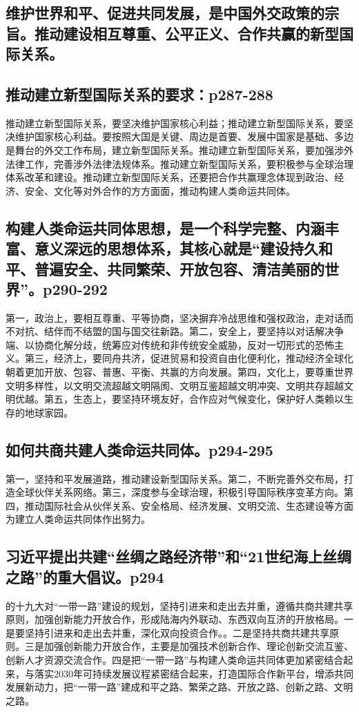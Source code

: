 \documentclass[UTF8]{ctexart}
\begin{document}
\subsection{维护世界和平、促进共同发展，是中国外交政策的宗旨。推动建设相互尊重、公平正义、合作共赢的新型国际关系。}
\subsection{推动建立新型国际关系的要求：p287-288}
推动建立新型国际关系，要坚决维护国家核心利益；推动建立新型国际关系，要坚决维护国家核心利益。要按照大国是关键、周边是首要、发展中国家是基础、多边是舞台的外交工作布局，建立新型国际关系。推动建立新型国际关系，要加强涉外法律工作，完善涉外法律法规体系。推动建立新型国际关系，要积极参与全球治理体系改革和建设。推动建立新型国际关系，还要把合作共赢理念体现到政治、经济、安全、文化等对外合作的方方面面，推动构建人类命运共同体。
\subsection{构建人类命运共同体思想，是一个科学完整、内涵丰富、意义深远的思想体系，其核心就是“建设持久和平、普遍安全、共同繁荣、开放包容、清洁美丽的世界”。p290-292}
第一，政治上，要相互尊重、平等协商，坚决摒弃冷战思维和强权政治，走对话而不对抗、结伴而不结盟的国与国交往新路。第二，安全上，要坚持以对话解决争端、以协商化解分歧，统筹应对传统和非传统安全威胁，反对一切形式的恐怖主义。第三，经济上，要同舟共济，促进贸易和投资自由化便利化，推动经济全球化朝着更加开放、包容、普惠、平衡、共赢的方向发展。第四，文化上，要尊重世界文明多样性，以文明交流超越文明隔阂、文明互鉴超越文明冲突、文明共存超越文明优越。第五，生态上，要坚持环境友好，合作应对气候变化，保护好人类赖以生存的地球家园。
\subsection{如何共商共建人类命运共同体。p294-295}
第一，坚持和平发展道路，推动建设新型国际关系。第二，不断完善外交布局，打造全球伙伴关系网络。第三，深度参与全球治理，积极引导国际秩序变革方向。第四，推动国际社会从伙伴关系、安全格局、经济发展、文明交流、生态建设等方面为建立人类命运共同体作出努力。
\subsection{习近平提出共建“丝绸之路经济带”和“21世纪海上丝绸之路”的重大倡议。p294}
的十九大对“一带一路”建设的规划，坚持引进来和走出去并重，遵循共商共建共享原则，加强创新能力开放合作，形成陆海内外联动、东西双向互济的开放格局。一是要坚持引进来和走出去并重，深化双向投资合作。。二是坚持共商共建共享原则。三是加强创新能力开放合作，主要是加强技术创新合作、理论创新交流互鉴、创新人才资源交流合作。四是把“一带一路”与构建人类命运共同体更加紧密结合起来，与落实2030年可持续发展议程紧密结合起来，打造国际合作新平台，增添共同发展新动力，把“一带一路”建成和平之路、繁荣之路、开放之路、创新之路、文明之路。
\end{document}
